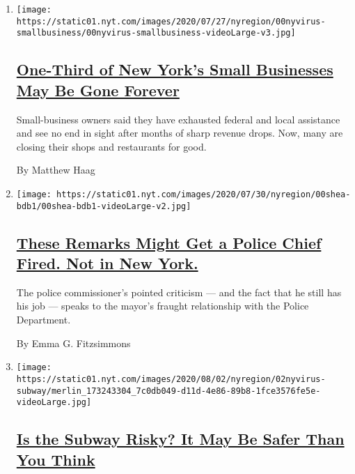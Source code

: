 \begin{enumerate}
\def\labelenumi{\arabic{enumi}.}
\item
  \texttt{[image: https://static01.nyt.com/images/2020/07/27/nyregion/00nyvirus-smallbusiness/00nyvirus-smallbusiness-videoLarge-v3.jpg]}

  \hypertarget{one-third-of-new-yorks-small-businesses-may-be-gone-forever}{%
  \subsection{\texorpdfstring{\href{/2020/08/03/nyregion/nyc-small-businesses-closing-coronavirus.html}{One-Third
  of New York's Small Businesses May Be Gone
  Forever}}{One-Third of New York's Small Businesses May Be Gone Forever}}\label{one-third-of-new-yorks-small-businesses-may-be-gone-forever}}

  Small-business owners said they have exhausted federal and local
  assistance and see no end in sight after months of sharp revenue
  drops. Now, many are closing their shops and restaurants for good.

  By Matthew Haag
\item
  \texttt{[image: https://static01.nyt.com/images/2020/07/30/nyregion/00shea-bdb1/00shea-bdb1-videoLarge-v2.jpg]}

  \hypertarget{these-remarks-might-get-a-police-chief-fired-not-in-new-york}{%
  \subsection{\texorpdfstring{\href{/2020/08/03/nyregion/police-shea-de-blasio-nyc.html}{These
  Remarks Might Get a Police Chief Fired. Not in New
  York.}}{These Remarks Might Get a Police Chief Fired. Not in New York.}}\label{these-remarks-might-get-a-police-chief-fired-not-in-new-york}}

  The police commissioner's pointed criticism --- and the fact that he
  still has his job --- speaks to the mayor's fraught relationship with
  the Police Department.

  By Emma G. Fitzsimmons
\item
  \texttt{[image: https://static01.nyt.com/images/2020/08/02/nyregion/02nyvirus-subway/merlin\_173243304\_7c0db049-d11d-4e86-89b8-1fce3576fe5e-videoLarge.jpg]}

  \hypertarget{is-the-subway-risky-it-may-be-safer-than-you-think}{%
  \subsection{\texorpdfstring{\href{/2020/08/02/nyregion/nyc-subway-coronavirus-safety.html}{Is
  the Subway Risky? It May Be Safer Than You
  Think}}{Is the Subway Risky? It May Be Safer Than You Think}}\label{is-the-subway-risky-it-may-be-safer-than-you-think}}


\end{enumerate}
